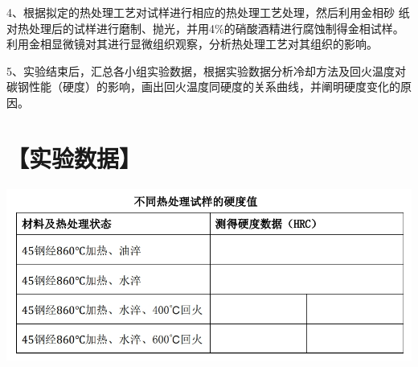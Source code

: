 \documentclass[a4paper,utf8]{article}
\begin{document}
4、根据拟定的热处理工艺对试样进行相应的热处理工艺处理，然后利用金相砂
纸对热处理后的试样进行磨制、抛光，并用4\%的硝酸酒精进行腐蚀制得金相试样。
利用金相显微镜对其进行显微组织观察，分析热处理工艺对其组织的影响。

5、实验结束后，汇总各小组实验数据，根据实验数据分析冷却方法及回火温度对碳钢性能（硬度）的影响，画出回火温度同硬度的关系曲线，并阐明硬度变化的原因。
\section*{【实验数据】}

\begin{center}
    \includegraphics[width=400pt]{5.png}
\end{center}
\end{document}
